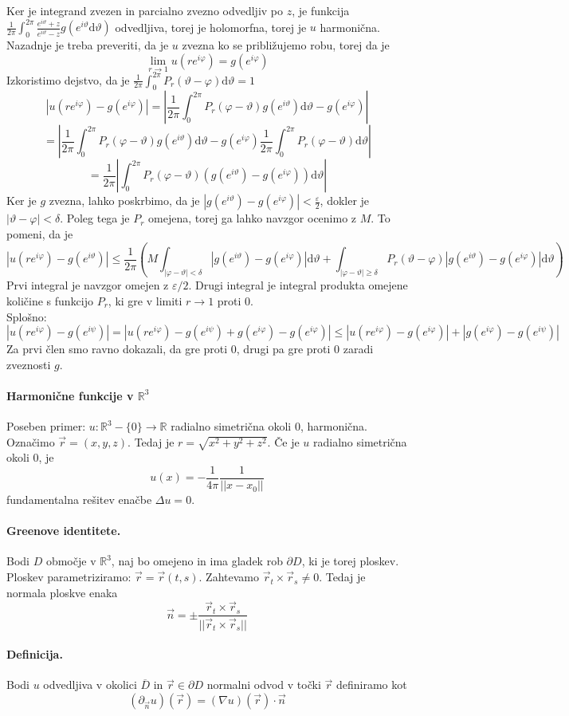 \documentclass[a4paper]{article}
\newcommand{\vct}[1]{\overrightarrow{#1}}
\newcommand{\dif}{\mathrm{d}}
\newcommand{\R}{\mathbb{R}}
\newcommand{\fn}[3]{{#1}\colon {#2} \rightarrow {#3}}
\begin{document}
Ker je integrand zvezen in parcialno zvezno odvedljiv po $z$, je funkcija $\displaystyle{\frac{1}{2\pi} \int_{0}^{2\pi}} \frac{e^{i\vartheta} + z}{e^{i\vartheta} - z} g(e^{i\vartheta} \dif\vartheta)$ odvedljiva, torej je holomorfna,
torej je $u$ harmonična. Nazadnje je treba preveriti, da je $u$ zvezna ko se približujemo robu, torej da je
$$\lim_{r \to 1} u(re^{i\varphi}) = g(e^{i\varphi})$$
Izkoristimo dejstvo, da je $\displaystyle{\frac{1}{2\pi}\int_{0}^{2\pi}P_r(\vartheta - \varphi) \dif\vartheta = 1}$
$$|u(re^{i\varphi}) - g(e^{i\varphi})| = \left|\frac{1}{2\pi}\int_{0}^{2\pi} P_r(\varphi - \vartheta) g(e^{i\vartheta}) \dif\vartheta - g(e^{i\varphi})\right|$$
$$= \left|\frac{1}{2\pi}\int_{0}^{2\pi} P_r(\varphi - \vartheta) g(e^{i\vartheta}) \dif\vartheta - g(e^{i\varphi}) \frac{1}{2\pi} \int_{0}^{2\pi}P_r(\varphi - \vartheta)\dif\vartheta\right|$$
$$= \frac{1}{2\pi}\left|\int_{0}^{2\pi}P_r(\varphi - \vartheta) \left(g(e^{i\vartheta}) - g(e^{i\varphi})\right)\dif\vartheta\right|$$
Ker je $g$ zvezna, lahko poskrbimo, da je $\displaystyle{\left|g(e^{i\vartheta}) - g(e^{i\varphi})\right| < \frac{\varepsilon}{2}}$, dokler je $|\vartheta - \varphi| < \delta$.
Poleg tega je $P_r$ omejena, torej ga lahko navzgor ocenimo z $M$. To pomeni, da je
$$|u(re^{i\varphi}) - g(e^{i\vartheta})| \leq \frac{1}{2\pi}\left(M\int_{|\varphi - \vartheta| < \delta} |g(e^{i\vartheta}) - g(e^{i\varphi})|\dif\vartheta + \int_{|\varphi - \vartheta| \geq \delta} P_r(\vartheta - \varphi)|g(e^{i\vartheta}) - g(e^{i\varphi})|\dif\vartheta\right)$$
Prvi integral je navzgor omejen z $\varepsilon/2$. Drugi integral je integral produkta omejene količine s funkcijo $P_r$, ki gre v limiti $r\to 1$ proti $0$. \\[2mm]
Splošno:
$$\left|u(re^{i\varphi}) - g(e^{i\psi})\right| = \left|u(re^{i\varphi}) - g(e^{i\psi}) + g(e^{i\varphi}) - g(e^{i\varphi})\right| \leq \left|u(re^{i\varphi}) - g(e^{i\varphi})\right| + \left|g(e^{i\varphi}) - g(e^{i\psi})\right|$$
Za prvi člen smo ravno dokazali, da gre proti $0$, drugi pa gre proti $0$ zaradi zveznosti $g$.
\paragraph{Harmonične funkcije v $\R^3$} Poseben primer: $\fn{u}{\R^3-\{0\}}{\R}$ radialno simetrična okoli $0$, harmonična. Označimo $\vct{r} = (x, y, z)$. Tedaj je $r = \sqrt{x^2 + y^2 + z^2}$.
Če je $u$ radialno simetrična okoli $0$, je $$u(x) = -\frac{1}{4\pi} \frac{1}{||x - x_0||}$$
fundamentalna rešitev enačbe $\Delta u = 0$.
\paragraph{ Greenove identitete.} Bodi $D$ območje v $\R^3$, naj bo omejeno in ima gladek rob $\partial D$, ki je torej ploskev. Ploskev parametriziramo: $\vct{r} = \vct{r}(t, s)$. Zahtevamo $\vct{r}_t \times \vct{r}_s \neq 0$.
Tedaj je normala ploskve enaka $$\vct{n} = \pm \frac{\vct{r}_t\times\vct{r}_s}{||\vct{r}_t\times\vct{r}_s||}$$
\paragraph{Definicija.} Bodi $u$ odvedljiva v okolici $\overline{D}$ in $\vct{r} \in \partial D$ normalni odvod v točki $\vct{r}$ definiramo kot
$$\left(\partial_{\vct{n}}u\right)(\vct{r}) = (\nabla u)(\vct{r}) \cdot \vct{n}$$
\end{document}
